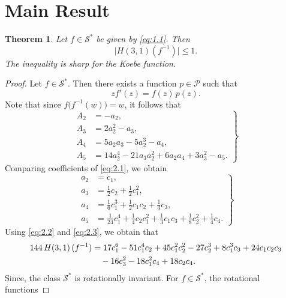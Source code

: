 \documentclass[a4paper,12pt,reqno]{amsart}
\numberwithin{equation}{section}
\newtheorem{thm}{Theorem}[section]
\begin{document}
	\section{Main Result}
	
	\begin{thm}
		\label{thm:2.1}
		Let $f \in \mathcal{S}^{*}$  be given by \eqref{eq:1.1}. Then
		\[
		\bigl| H(3,1)(f^{-1}) \bigr| \le 1.
		\]
		The inequality is sharp for the Koebe function.
	\end{thm}
	
	\begin{proof}
		Let $f \in \mathcal{S}^{*}$. Then there exists a function $p \in \mathcal{P}$ such that
		\begin{equation}\label{eq:2.1}
			z f'(z) = f(z)\,p(z).
		\end{equation}
		Note that since $f\bigl(f^{-1}(w)\bigr) = w$, it follows that
		\begin{equation}\label{eq:2.2}
			\left.
			\begin{aligned}
				A_2 &= -a_2,\\
				A_3 &= 2a_2^2 - a_3,\\
				A_4 &= 5 a_2 a_3 - 5 a_2^3 - a_4,\\
				A_5 &= 14 a_2^4 - 21 a_3 a_2^2 + 6 a_2 a_4 + 3 a_3^2 - a_5.
			\end{aligned}
			\right\}
		\end{equation}
		Comparing coefficients of \eqref{eq:2.1}, we obtain
		\begin{equation}\label{eq:2.3}
			\left.
			\begin{aligned}
				a_2 &= c_1,\\
				a_3 &= \frac{1}{2} c_2 + \frac{1}{2} c_1^2,\\
				a_4 &= \frac{1}{6} c_1^3 + \frac{1}{2} c_1 c_2 + \frac{1}{3} c_3,\\
				a_5 &= \frac{1}{24} c_1^4 + \frac{1}{4} c_2 c_1^2 + \frac{1}{3} c_1 c_3
				+ \frac{1}{8} c_2^2 + \frac{1}{4} c_4.
			\end{aligned}
			\right\}
		\end{equation}
		Using \eqref{eq:2.2} and \eqref{eq:2.3}, we obtain that
		\begin{align}\label{eq:2.4}
			144\, H(3,1)\,(f^{-1}) &=
			17 c_1^6 - 51 c_1^4 c_2 + 45 c_1^2 c_2^2 - 27 c_2^3
			+ 8 c_1^3 c_3 + 24 c_1 c_2 c_3\notag\\
			&\quad - 16 c_3^2
			- 18 c_1^2 c_4 + 18 c_2 c_4.
		\end{align}
		Since,  the class $\mathcal{S}^{*}$ is rotationally invariant. For $f \in \mathcal{S}^*$, the rotational functions 

\end{proof}
\end{document}
